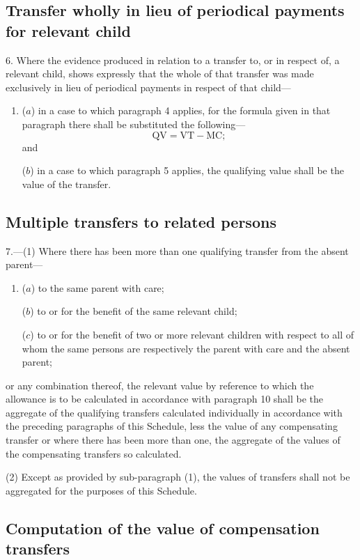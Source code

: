 \documentclass[a4paper]{article}
\begin{document}
\subsection*{\sloppy Transfer wholly in lieu of periodical payments for relevant child}

6.  Where the evidence produced in relation to a transfer to, or in respect of, a relevant child, shows expressly that the whole of that transfer was made exclusively in lieu of periodical payments in respect of that child—
\begin{enumerate}\item[]
($a$) in a case to which paragraph 4 applies, for the formula given in that paragraph there shall be substituted the following—
\[\mathrm{QV} = \mathrm{VT} - \mathrm{MC};\]
and

($b$) in a case to which paragraph 5 applies, the qualifying value shall be the value of the transfer.
\end{enumerate}

\subsection*{Multiple transfers to related persons}

7.—(1) Where there has been more than one qualifying transfer from the absent parent—
\begin{enumerate}\item[]
($a$) to the same parent with care;

($b$) to or for the benefit of the same relevant child;

($c$) to or for the benefit of two or more relevant children with respect to all of whom the same persons are respectively the parent with care and the absent parent;
\end{enumerate}
or any combination thereof, the relevant value by reference to which the allowance is to be calculated in accordance with paragraph 10 shall be the aggregate of the qualifying transfers calculated individually in accordance with the preceding paragraphs of this Schedule, less the value of any compensating transfer or where there has been more than one, the aggregate of the values of the compensating transfers so calculated.

(2) Except as provided by sub-paragraph (1), the values of transfers shall not be aggregated for the purposes of this Schedule.

\subsection*{Computation of the value of compensation transfers}
\end{document}
